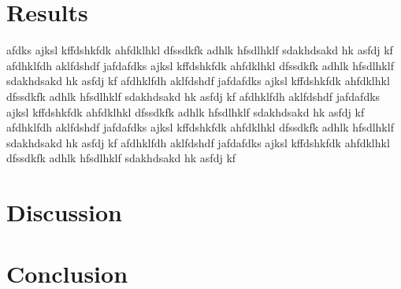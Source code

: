 \chapter*{Results}

afdks ajksl kffdshkfdk ahfdklhkl dfssdkfk adhlk hfsdlhklf sdakhdsakd hk asfdj kf afdhklfdh aklfdshdf jafdafdks ajksl kffdshkfdk ahfdklhkl dfssdkfk adhlk hfsdlhklf sdakhdsakd hk asfdj kf afdhklfdh aklfdshdf jafdafdks ajksl kffdshkfdk ahfdklhkl dfssdkfk adhlk hfsdlhklf sdakhdsakd hk asfdj kf afdhklfdh aklfdshdf jafdafdks ajksl kffdshkfdk ahfdklhkl dfssdkfk adhlk hfsdlhklf sdakhdsakd hk asfdj kf afdhklfdh aklfdshdf jafdafdks ajksl kffdshkfdk ahfdklhkl dfssdkfk adhlk hfsdlhklf sdakhdsakd hk asfdj kf afdhklfdh aklfdshdf jafdafdks ajksl kffdshkfdk ahfdklhkl dfssdkfk adhlk hfsdlhklf sdakhdsakd hk asfdj kf

\chapter*{Discussion}

\chapter*{Conclusion}
